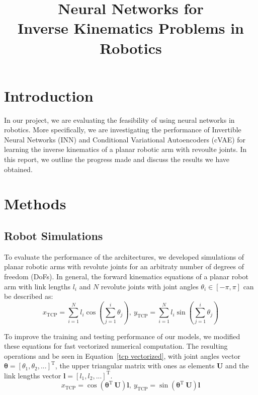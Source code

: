 \documentclass[conference]{IEEEtran}
\begin{document}
\title{Neural Networks for \\Inverse Kinematics Problems in Robotics}

\author{
    \and
}

\maketitle

\section*{Introduction}

In our project, we are evaluating the feasibility of using neural networks in robotics. More specifically, we are investigating the performance of Invertible Neural Networks (INN) and Conditional Variational Autoencoders (cVAE) for learning the inverse kinematics of a planar robotic arm with revoulte joints. In this report, we outline the progress made and discuss the results we have obtained.

\section*{Methods}
\subsection*{Robot Simulations}

To evaluate the performance of the architectures, we developed simulations of planar robotic arms with revolute joints for an arbitraty number of degrees of freedom (DoFs). In general, the forward kinematics equations of a planar robot arm with link lengths \( l_i \) and \( N \) revolute joints with joint angles \( \theta_i \in [-\pi, \pi] \) can be described as:
\begin{equation}
    x_\text{TCP} = \sum_{i=1}^{N}{l_i \cos\left( \sum_{j=1}^{i}{\theta_j} \right)}, \ 
    y_\text{TCP} = \sum_{i=1}^{N}{l_i \sin\left( \sum_{j=1}^{i}{\theta_j} \right)}
\end{equation}

To improve the training and testing performance of our models, we modified these equations for fast vectorized numerical computation. The resulting operations and be seen in Equation~\ref{tcp vectorized}, with joint angles vector \( \bm{\theta} = \left[ \theta_1, \theta_2 , ... \right]^\text{T} \), the upper triangular matrix with ones as elements \( \bm{U} \) and the link lengths vector \( \bm{l} = \left[ l_1, l_2, ... \right]^\text{T} \).
\begin{equation}
    x_\text{TCP} = \cos \left( \bm{\theta}^\text{T}\ \bm{U} \right) \bm{l}, \ 
    y_\text{TCP} = \sin \left( \bm{\theta}^\text{T}\ \bm{U} \right) \bm{l}
    \label{tcp vectorized}
\end{equation}
\end{document}
